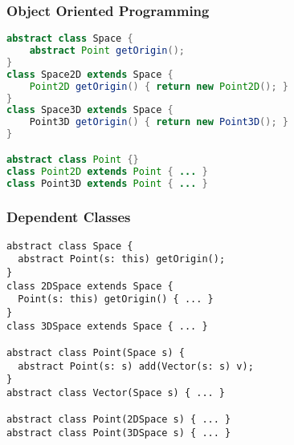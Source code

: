 \lstset{ language=scala,basicstyle=\small }

\begin{frame}[fragile]
\frametitle{Object Oriented Programming}
\begin{lstlisting}[language=java]
abstract class Space {
    abstract Point getOrigin();
}
class Space2D extends Space {
    Point2D getOrigin() { return new Point2D(); }
}
class Space3D extends Space {
    Point3D getOrigin() { return new Point3D(); }
}

abstract class Point {}
class Point2D extends Point { ... }
class Point3D extends Point { ... }
\end{lstlisting}
\end{frame}

\begin{frame}[fragile]
\frametitle{Dependent Classes}
\begin{lstlisting}
abstract class Space {
  abstract Point(s: this) getOrigin();
}
class 2DSpace extends Space {
  Point(s: this) getOrigin() { ... }
}
class 3DSpace extends Space { ... }

abstract class Point(Space s) {
  abstract Point(s: s) add(Vector(s: s) v);
}
abstract class Vector(Space s) { ... }

abstract class Point(2DSpace s) { ... }
abstract class Point(3DSpace s) { ... }
\end{lstlisting}
\end{frame}
